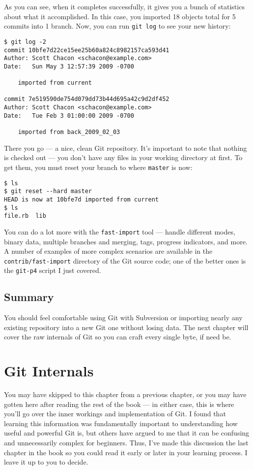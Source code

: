 \documentclass[a4paper]{book}
\newcounter{tab}[chapter]
\newcommand{\chap}[1]{\newpage\thispagestyle{empty}\chapter{#1}\label{chap:\thechapter}}
\begin{document}
As you can see, when it completes successfully, it gives you a bunch of statistics about what it accomplished. In this case, you imported 18 objects total for 5 commits into 1 branch. Now, you can run \texttt{git log} to see your new history:

\begin{shaded}\begin{verbatim}
$ git log -2
commit 10bfe7d22ce15ee25b60a824c8982157ca593d41
Author: Scott Chacon <schacon@example.com>
Date:   Sun May 3 12:57:39 2009 -0700

    imported from current

commit 7e519590de754d079dd73b44d695a42c9d2df452
Author: Scott Chacon <schacon@example.com>
Date:   Tue Feb 3 01:00:00 2009 -0700

    imported from back_2009_02_03
\end{verbatim}\end{shaded}

There you go --- a nice, clean Git repository. It's important to note that nothing is checked out --- you don't have any files in your working directory at first. To get them, you must reset your branch to where \texttt{master} is now:

\begin{shaded}\begin{verbatim}
$ ls
$ git reset --hard master
HEAD is now at 10bfe7d imported from current
$ ls
file.rb  lib
\end{verbatim}\end{shaded}

You can do a lot more with the \texttt{fast-import} tool --- handle different modes, binary data, multiple branches and merging, tags, progress indicators, and more. A number of examples of more complex scenarios are available in the \texttt{contrib/fast-import} directory of the Git source code; one of the better ones is the \texttt{git-p4} script I just covered.

\section{Summary}

You should feel comfortable using Git with Subversion or importing nearly any existing repository into a new Git one without losing data. The next chapter will cover the raw internals of Git so you can craft every single byte, if need be.

\chap{Git Internals}

You may have skipped to this chapter from a previous chapter, or you may have gotten here after reading the rest of the book --- in either case, this is where you'll go over the inner workings and implementation of Git. I found that learning this information was fundamentally important to understanding how useful and powerful Git is, but others have argued to me that it can be confusing and unnecessarily complex for beginners. Thus, I've made this discussion the last chapter in the book so you could read it early or later in your learning process. I leave it up to you to decide.
\end{document}
